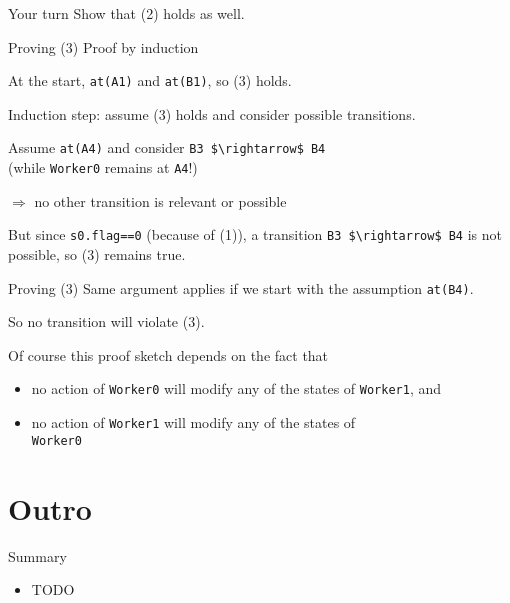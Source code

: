 \begin{frame}{Your turn}
  Show that (2) holds as well.
\end{frame}

\begin{frame}[fragile]{Proving (3)}
  Proof by induction


  At the start, \lstinline!at(A1)! and \lstinline!at(B1)!, so (3)
  holds.


  Induction step: assume (3) holds and consider possible transitions.


  Assume \lstinline!at(A4)! and consider
  \lstinline!B3 $\rightarrow$ B4! \\
  (while \lstinline!Worker0! remains at \lstinline!A4!!)

  $\Rightarrow$ no other transition is relevant or possible


  But since \lstinline!s0.flag==0! (because of (1)), a transition
  \lstinline!B3 $\rightarrow$ B4! is not possible, so (3) remains
  true.
\end{frame}

\begin{frame}{Proving (3)}
  Same argument applies if we start with the assumption
  \lstinline!at(B4)!.


  So no transition will violate (3).


  Of course this proof sketch depends on the fact that

  \begin{itemize}
  \item no action of \lstinline!Worker0! will modify any of the states
    of \lstinline!Worker1!, and
  \item no action of \lstinline!Worker1! will modify any of the states
    of \\
    \lstinline!Worker0!
  \end{itemize}
\end{frame}


\section*{Outro}

\begin{frame}{Summary}
  \begin{itemize}
  \item TODO
  \end{itemize}
\end{frame}


